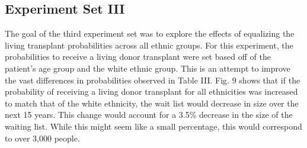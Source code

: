 \documentclass[9pt,a4paper,twocolumn]{scrartcl}
\begin{document}
\subsection{Experiment Set III}
The goal of the third experiment set was to explore the effects of equalizing the living transplant probabilities across all ethnic groups.  For this experiment, the probabilities to receive a living donor transplant were set based off of the patient’s age group and the white ethnic group.  This is an attempt to improve the vast differences in probabilities observed in Table III.  
Fig. 9 shows that if the probability of receiving a living donor transplant for all ethnicities was increased to match that of the white ethnicity, the wait list would decrease in size over the next 15 years.  This change would account for a 3.5\% decrease in the size of the waiting list.  While this might seem like a small percentage, this would correspond to over 3,000 people.
\end{document}
